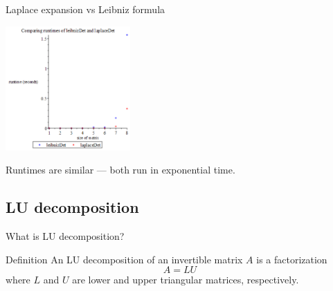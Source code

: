 \documentclass[handout]{beamer}
\begin{document}
\begin{frame}{Laplace expansion vs Leibniz formula}

    \begin{center}{}
        \includegraphics[height=180]{leibniz-laplace}
    \end{center}

    Runtimes are similar --- both run in exponential time.

\end{frame}

\subsection{LU decomposition}

\begin{frame}{What is LU decomposition?}

    \begin{block}{Definition}
        An LU decomposition of an invertible matrix $A$ is a factorization
        \[
            A = L U
        \]
        where $L$ and $U$ are lower and upper triangular matrices, respectively.
    \end{block}

\end{frame}
\end{document}
